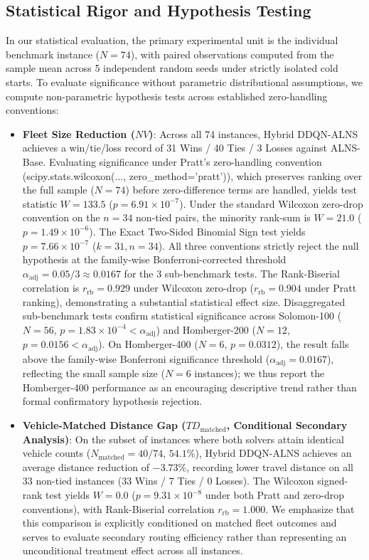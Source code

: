\documentclass{ieeeaccess}
\begin{document}
\subsection{Statistical Rigor and Hypothesis Testing}
\label{sec:statistical_rigor}

In our statistical evaluation, the primary experimental unit is the individual benchmark instance ($N=74$), with paired observations computed from the sample mean across 5 independent random seeds under strictly isolated cold starts. To evaluate significance without parametric distributional assumptions, we compute non-parametric hypothesis tests across established zero-handling conventions:
\begin{itemize}
    \item \textbf{Fleet Size Reduction ($NV$)}: Across all 74 instances, Hybrid DDQN-ALNS achieves a win/tie/loss record of 31 Wins / 40 Ties / 3 Losses against ALNS-Base. Evaluating significance under Pratt's zero-handling convention (\textsf{\small scipy.stats.wilcoxon(..., zero\_method='pratt')}), which preserves ranking over the full sample ($N=74$) before zero-difference terms are handled, yields test statistic $W = 133.5$ ($p = 6.91 \times 10^{-7}$). Under the standard Wilcoxon zero-drop convention on the $n=34$ non-tied pairs, the minority rank-sum is $W = 21.0$ ($p = 1.49 \times 10^{-6}$). The Exact Two-Sided Binomial Sign test yields $p = 7.66 \times 10^{-7}$ ($k=31, n=34$). All three conventions strictly reject the null hypothesis at the family-wise Bonferroni-corrected threshold $\alpha_{\text{adj}} = 0.05 / 3 \approx 0.0167$ for the 3 sub-benchmark tests. The Rank-Biserial correlation is $r_{\text{rb}} = 0.929$ under Wilcoxon zero-drop ($r_{\text{rb}} = 0.904$ under Pratt ranking), demonstrating a substantial statistical effect size. Disaggregated sub-benchmark tests confirm statistical significance across Solomon-100 ($N=56$, $p = 1.83 \times 10^{-4} < \alpha_{\text{adj}}$) and Homberger-200 ($N=12$, $p = 0.0156 < \alpha_{\text{adj}}$). On Homberger-400 ($N=6$, $p = 0.0312$), the result falls above the family-wise Bonferroni significance threshold ($\alpha_{\text{adj}} = 0.0167$), reflecting the small sample size ($N=6$ instances); we thus report the Homberger-400 performance as an encouraging descriptive trend rather than formal confirmatory hypothesis rejection.
    \item \textbf{Vehicle-Matched Distance Gap ($TD_{\text{matched}}$, Conditional Secondary Analysis)}: On the subset of instances where both solvers attain identical vehicle counts ($N_{\text{matched}} = 40 / 74$, $54.1\%$), Hybrid DDQN-ALNS achieves an average distance reduction of $-3.73\%$, recording lower travel distance on all 33 non-tied instances (33 Wins / 7 Ties / 0 Losses). The Wilcoxon signed-rank test yields $W = 0.0$ ($p = 9.31 \times 10^{-8}$ under both Pratt and zero-drop conventions), with Rank-Biserial correlation $r_{\text{rb}} = 1.000$. We emphasize that this comparison is explicitly conditioned on matched fleet outcomes and serves to evaluate secondary routing efficiency rather than representing an unconditional treatment effect across all instances.

\end{itemize}
\end{document}
